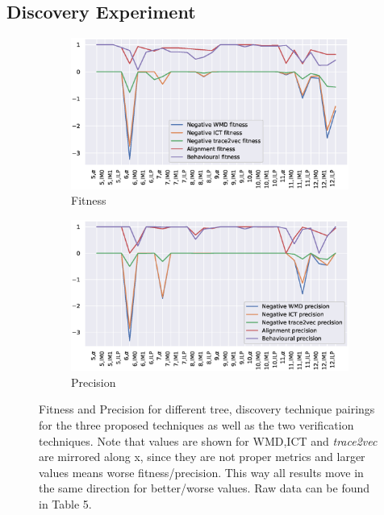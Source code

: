 \documentclass[runningheads]{template/llncs}
\begin{document}
\subsection{Discovery Experiment}
\begin{figure}
	\centering
	\begin{subfigure}[b]{0.49\textwidth}
		\centering
		\includegraphics[width=\textwidth]{figures/fitness}
		\caption{Fitness}
		\label{fig:fitness}
	\end{subfigure}
	\hfill
	\begin{subfigure}[b]{0.49\textwidth}
		\centering
		\includegraphics[width=\textwidth]{figures/precision}
		\caption{Precision}
		\label{fig:precision}
	\end{subfigure}
\caption{Fitness and Precision for different tree, discovery technique pairings for the three proposed techniques as well as the two verification techniques. 
	Note that values are shown for WMD,ICT and \emph{trace2vec} are mirrored along x, since they are not proper metrics and larger values means worse fitness/precision. 
	This way all results move in the same direction for better/worse values.
Raw data can be found in \cite{PBWe20} Table 5.}
\label{fig:discovery}
\end{figure}
\end{document}
